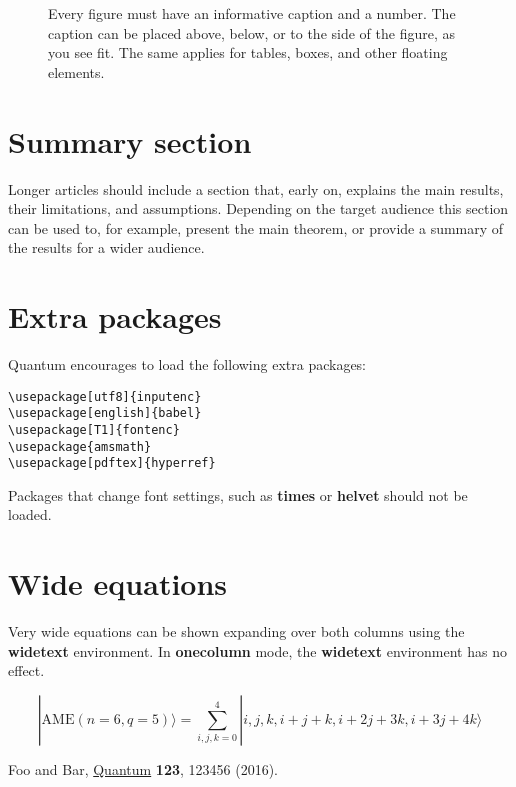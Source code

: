 \documentclass[prx,a4paper,aps,twocolumn,superscriptaddress,11p]{quantumarticle}
\begin{document}
\begin{figure}[tb]
  \centering
  \caption{Every figure must have an informative caption and a number.
    The caption can be placed above, below, or to the side of the figure, as you see fit.
    The same applies for tables, boxes, and other floating elements.}
  \label{fig:figure1}
\end{figure}

\section{Summary section}
\label{sec:sec1}
Longer articles should include a section that, early on, explains the main results, their limitations, and assumptions.
Depending on the target audience this section can be used to, for example, present the main theorem, or provide a summary of the results for a wider audience.

\section{Extra packages}
Quantum encourages to load the following extra packages: 
\begin{verbatim}
\usepackage[utf8]{inputenc}
\usepackage[english]{babel}
\usepackage[T1]{fontenc}
\usepackage{amsmath}  
\usepackage[pdftex]{hyperref}  
\end{verbatim}
Packages that change font settings, such as \textbf{times} or \textbf{helvet} should not be loaded.

\section{Wide equations}
\label{sec:sec1}
Very wide equations can be shown expanding over both columns using the \textbf{widetext} environment.
In \textbf{onecolumn} mode, the \textbf{widetext} environment has no effect.
\begin{widetext}
  \begin{equation}
|\mathrm{AME}(n=6,q=5)\rangle=\sum_{i,j,k=0}^4 |i,j,k,i+j+k,i+2j+3k,i+3j+4k\rangle
  \end{equation}
\end{widetext}


\begin{thebibliography}{9}
  Foo and Bar, \href{http://quantum-journal.org}{Quantum} \textbf{123}, 123456 (2016).
\end{thebibliography}
\end{document}

